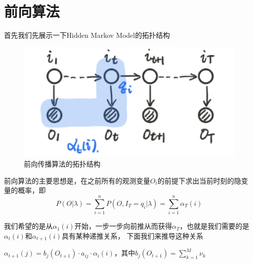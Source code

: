 \section{前向算法}


首先我们先展示一下Hidden Markov Model的拓扑结构
\begin{figure}[H]
    \centering
    \includegraphics[scale=0.5]{figures/前向算法的拓扑结构.png}
    \caption{前向传播算法的拓扑结构}
\end{figure}

前向算法的主要思想是，在之前所有的观测变量$O_t$的前提下求出当前时刻的隐变量的概率，即
\begin{equation}
    P(O|\lambda)=\sum_{i=1}^{n} P(O,I_T=q_i|\lambda)=\sum_{i=1}^{n} \alpha_T(i)
\end{equation}

我们希望的是从$\alpha_1(i)$开始，一步一步向前推从而获得$\alpha_T$，也就是我们需要的是$\alpha_t(i)$和$\alpha_{t+1}(i)$具有某种递推关系，
下面我们来推导这种关系

\begin{mdframed}
    \begin{proposition}
        $\alpha_{t+1}(j)=b_j(O_{t+1})\cdot a_{ij}\cdot\alpha_i(i)$，其中$b_j(O_{t+1})=\sum_{k=1}^{M}\nu_k$
    \end{proposition}
\end{mdframed}

